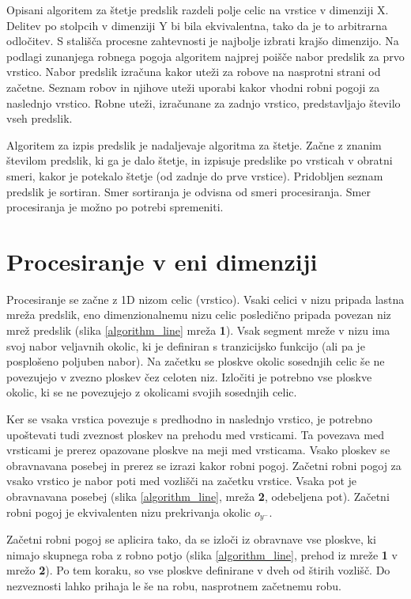 \documentclass[12pt,a4paper,openany,twoside]{book}
\begin{document}
Opisani algoritem za štetje predslik razdeli polje celic na vrstice v dimenziji X.
Delitev po stolpcih v dimenziji Y bi bila ekvivalentna, tako da je to arbitrarna odločitev.
S stališča procesne zahtevnosti je najbolje izbrati krajšo dimenzijo.
Na podlagi zunanjega robnega pogoja algoritem najprej poišče nabor predslik za prvo vrstico.
Nabor predslik izračuna kakor uteži za robove na nasprotni strani od začetne.
Seznam robov in njihove uteži uporabi kakor vhodni robni pogoji za naslednjo vrstico.
Robne uteži, izračunane za zadnjo vrstico, predstavljajo število vseh predslik.

Algoritem za izpis predslik je nadaljevaje algoritma za štetje.
Začne z znanim številom predslik, ki ga je dalo štetje, in izpisuje predslike
po vrsticah v obratni smeri, kakor je potekalo štetje (od zadnje do prve vrstice).
Pridobljen seznam predslik je sortiran. Smer sortiranja je odvisna od smeri procesiranja.
Smer procesiranja je možno po potrebi spremeniti.

\section{Procesiranje v eni dimenziji}

Procesiranje se začne z 1D nizom celic (vrstico).
Vsaki celici v nizu pripada lastna mreža predslik, eno dimenzionalnemu nizu celic
posledično pripada povezan niz mrež predslik (slika \ref{algorithm_line} mreža \textbf{1}).
Vsak segment mreže v nizu ima svoj nabor veljavnih okolic,
ki je definiran s tranzicijsko funkcijo (ali pa je posplošeno poljuben nabor).
Na začetku se ploskve okolic sosednjih celic še ne povezujejo v
zvezno ploskev čez celoten niz. Izločiti je potrebno vse ploskve okolic,
ki se ne povezujejo z okolicami svojih sosednjih celic.

Ker se vsaka vrstica povezuje s predhodno in naslednjo vrstico, je potrebno
upoštevati tudi zveznost ploskev na prehodu med vrsticami.
Ta povezava med vrsticami je prerez opazovane ploskve na meji med vrsticama.
Vsako ploskev se obravnavana posebej in prerez se izrazi kakor robni pogoj.
Začetni robni pogoj za vsako vrstico je nabor poti med vozlišči na začetku vrstice.
Vsaka pot je obravnavana posebej (slika \ref{algorithm_line}, mreža \textbf{2}, odebeljena pot).
Začetni robni pogoj je ekvivalenten nizu prekrivanja okolic \(o_{y^-}\).

Začetni robni pogoj se aplicira tako, da se izloči iz obravnave vse ploskve,
ki nimajo skupnega roba z robno potjo (slika \ref{algorithm_line},
prehod iz mreže \textbf{1} v mrežo \textbf{2}). Po tem koraku, so vse ploskve definirane
v dveh od štirih vozlišč. Do nezveznosti lahko prihaja le še na robu, nasprotnem
začetnemu robu.
\end{document}

